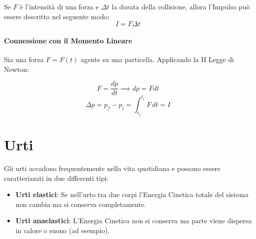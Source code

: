         Se $F$ è l'intensità di una forza e $\Delta t$ la durata della 
        collisione, allora l'Impulso può essere descritto nel seguente modo:
        \begin{equation}
            I = F \Delta t
        \end{equation}

        \paragraph{Connessione con il Momento Lineare} Sia una forza $F = F(t)$
        agente su una particella. Applicando la II Legge di Newton:

        \begin{equation*}
            F = \frac{dp}{dt} \implies dp = F dt
        \end{equation*}
        \begin{equation*}
            \Delta p = p_f - p_i = \int_{t_f}^{t_i} F \,dt = I 
        \end{equation*}
    
    \section{Urti} Gli urti accadono frequentemente nella vita quotidiana e 
    possono essere caratterizzati in due differenti tipi:
    \begin{itemize}
        \item \textbf{Urti elastici}: Se nell'urto tra due corpi l'Energia 
        Cinetica totale del sistema non cambia ma si conserva completamente.
        \item \textbf{Urti anaelastici}: L'Energia Cinetica non si conserva ma 
        parte viene dispersa in calore o suono (ad esempio).
    \end{itemize} 

